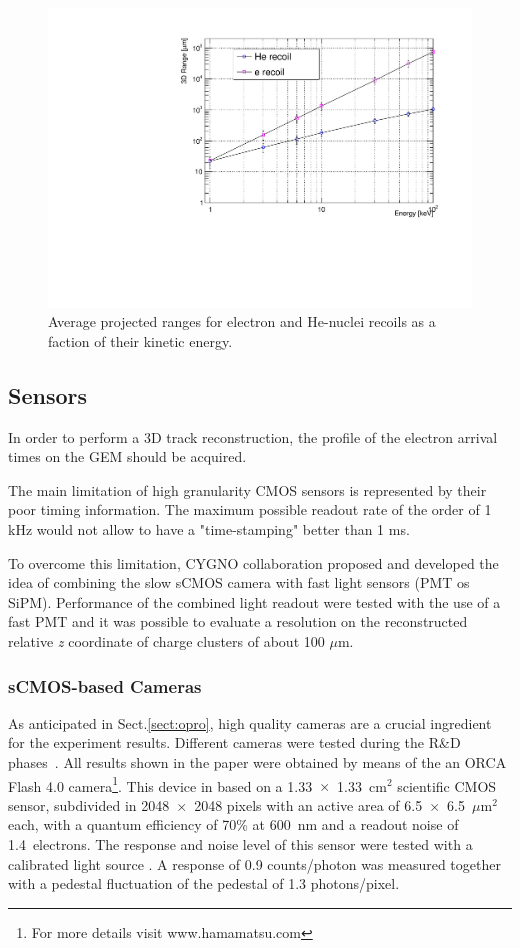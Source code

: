 \documentclass[review]{elsarticle}
\begin{document}
\begin{figure}[ht]
  \begin{center}
    \includegraphics[width=0.49\linewidth]{range_ER_NR.pdf}
    \caption{Average projected ranges for electron and He-nuclei recoils as a faction of their kinetic energy.}
      \label{fig:range}
      \end{center}
\end{figure}


 
\subsection{Sensors}
\label{sect:sensors}

In order to perform a 3D track reconstruction, the profile of the electron
arrival times on the GEM should be acquired.

The main limitation of high granularity CMOS sensors is 
represented by their poor timing information. The maximum possible readout rate of the order of 1 kHz would not allow to have a "time-stamping" better than 1 ms.

To overcome this limitation, CYGNO collaboration proposed and developed the idea of combining the slow sCMOS camera with fast light sensors (PMT os SiPM).
Performance of the combined light readout were tested with the use of a fast PMT \cite{bib:combined} and it was possible to evaluate a resolution on the reconstructed relative {\it z} coordinate of charge clusters of about 100 $\mu$m.

\subsubsection{sCMOS-based Cameras}

As anticipated in Sect.\ref{sect:opro}, high quality cameras are a crucial ingredient for the experiment results. Different cameras were tested during the R\&D phases~\cite{bib:cameras}. All results shown in the paper were obtained by means of the 
 an ORCA Flash 4.0 camera\footnote{For more details visit www.hamamatsu.com}. This device in based on a 1.33~$\times$~1.33~cm$^2$ scientific CMOS sensor, subdivided in 2048~$\times$~2048 pixels with an active area of 6.5~$\times$~6.5~$\mu$m$^2$ each, with
 a quantum efficiency of 70\% at 600~nm and a readout noise of 1.4~electrons.
 The response and noise level of this sensor were tested with a calibrated light source \cite{bib:jinst_orange1}. A response of 0.9 counts/photon was measured together with a pedestal fluctuation of the pedestal of 1.3 photons/pixel. 
 
\end{document}
